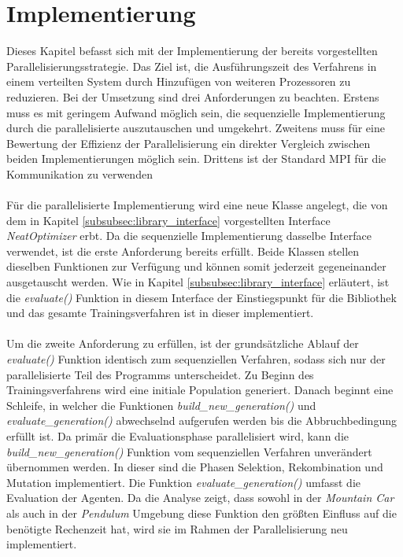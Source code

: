 \section{Implementierung}
\label{sec:parallel_implementation}
Dieses Kapitel befasst sich mit der Implementierung der bereits vorgestellten Parallelisierungsstrategie. Das Ziel ist, die Ausführungszeit des Verfahrens in einem verteilten System durch Hinzufügen von weiteren Prozessoren zu reduzieren. Bei der Umsetzung sind drei Anforderungen zu beachten. Erstens muss es mit geringem Aufwand möglich sein, die sequenzielle Implementierung durch die parallelisierte auszutauschen und umgekehrt. Zweitens muss für eine Bewertung der Effizienz der Parallelisierung ein direkter Vergleich zwischen beiden Implementierungen möglich sein. Drittens ist der Standard \ac{MPI} für die Kommunikation zu verwenden
\\\\
Für die parallelisierte Implementierung wird eine neue Klasse angelegt, die von dem in Kapitel \ref{subsubsec:library_interface} vorgestellten Interface \emph{NeatOptimizer} erbt. Da die sequenzielle Implementierung dasselbe Interface verwendet, ist die erste Anforderung bereits erfüllt. Beide Klassen stellen dieselben Funktionen zur Verfügung und können somit jederzeit gegeneinander ausgetauscht werden. Wie in Kapitel \ref{subsubsec:library_interface} erläutert, ist die \emph{evaluate()} Funktion in diesem Interface der Einstiegspunkt für die Bibliothek und das gesamte Trainingsverfahren ist in dieser implementiert. 
\\\\
Um die zweite Anforderung zu erfüllen, ist der grundsätzliche Ablauf der \emph{evaluate()} Funktion identisch zum sequenziellen Verfahren, sodass sich nur der parallelisierte Teil des Programms unterscheidet. Zu Beginn des Trainingsverfahrens wird eine initiale Population generiert. Danach beginnt eine Schleife, in welcher die Funktionen \emph{build\_new\_generation()} und \emph{evaluate\_generation()} abwechselnd aufgerufen werden bis die Abbruchbedingung erfüllt ist. Da primär die Evaluationsphase parallelisiert wird, kann die \emph{build\_new\_generation()} Funktion vom sequenziellen Verfahren unverändert übernommen werden. In dieser sind die Phasen Selektion, Rekombination und Mutation implementiert. Die Funktion \emph{evaluate\_generation()} umfasst die Evaluation der Agenten. Da die Analyse zeigt, dass sowohl in der \emph{Mountain Car} als auch in der \emph{Pendulum} Umgebung diese Funktion den größten Einfluss auf die benötigte Rechenzeit hat, wird sie im Rahmen der Parallelisierung neu implementiert.
